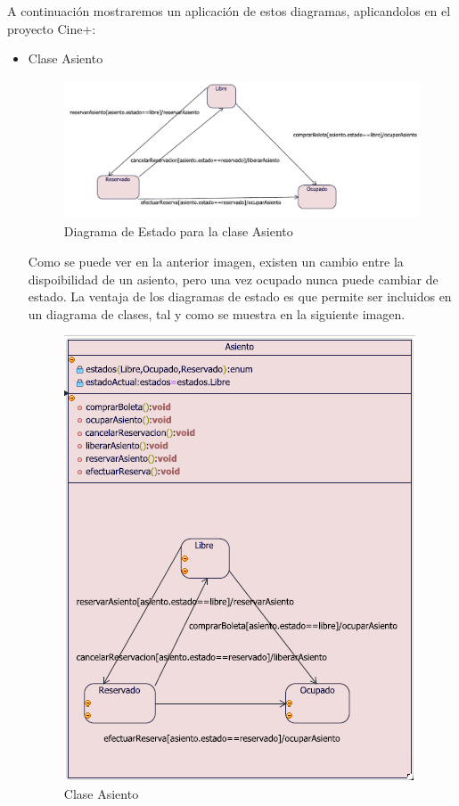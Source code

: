 A continuación mostraremos un aplicación de estos diagramas, aplicandolos en el proyecto Cine+:
\begin{itemize}
\item{Clase Asiento}
\begin{figure}[h!]
	\centering
		\includegraphics[scale=0.6]{diseno/estado/imgs/estadosAsiento}
	\caption{Diagrama de Estado para la clase Asiento}
\end{figure}

Como se puede ver en la anterior imagen, existen un cambio entre la dispoibilidad de un asiento, pero una vez ocupado nunca puede cambiar de estado. La ventaja de los diagramas de estado es que permite ser incluidos en un diagrama de clases, tal y como se muestra en la siguiente imagen.
\begin{figure}[h!]
	\centering
		\includegraphics[scale=0.6]{diseno/estado/imgs/estadoClaseAsiento}
	\caption{Clase Asiento}
\end{figure}


\end{itemize}
